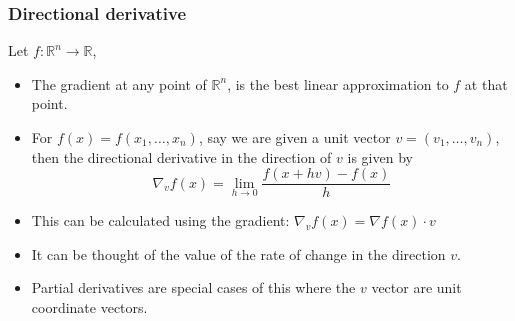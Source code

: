 \documentclass{beamer}
\begin{document}
\begin{frame}
\frametitle{Directional derivative}
Let $f: \mathbb{R}^n \rightarrow \mathbb{R}$,
\begin{itemize}
    \item The gradient at any point of $\mathbb{R}^n$, is the best linear approximation to $f$ at that point.
    \item For $f(x) = f(x_1,\dots, x_n)$, say we are given a unit vector $v=(v_1,\dots, v_n)$, then the directional derivative in the direction of $v$ is given by \[ \nabla_v f(x) = \lim_{h\rightarrow 0}\frac{f(x+hv)-f(x)}{h} \]
    \item This can be calculated using the gradient: $\nabla_v f(x) = \nabla f(x) \cdot v$
    \item It can be thought of the value of the rate of change in the direction $v$.
    \item Partial derivatives are special cases of this where the $v$ vector are unit coordinate vectors.
\end{itemize}


\end{frame}

\end{document}
